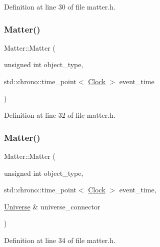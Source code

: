 Definition at line 30 of file matter.\+h.

\mbox{\label{class_matter_ae15b0b8d811fb2ffd01ea039777d1b95}} 
\subsubsection{\texorpdfstring{Matter()}{Matter()}\hspace{0.1cm}{\footnotesize\ttfamily [3/4]}}
{\footnotesize\ttfamily Matter\+::\+Matter (\begin{DoxyParamCaption}\item[{unsigned int}]{object\+\_\+type,  }\item[{std\+::chrono\+::time\+\_\+point$<$ \mbox{\hyperlink{universe_8h_a0ef8d951d1ca5ab3cfaf7ab4c7a6fd80}{Clock}} $>$}]{event\+\_\+time }\end{DoxyParamCaption})\hspace{0.3cm}{\ttfamily [inline]}}



Definition at line 32 of file matter.\+h.

\mbox{\label{class_matter_a724543a0439d3099f5fc0eae68110b75}} 
\subsubsection{\texorpdfstring{Matter()}{Matter()}\hspace{0.1cm}{\footnotesize\ttfamily [4/4]}}
{\footnotesize\ttfamily Matter\+::\+Matter (\begin{DoxyParamCaption}\item[{unsigned int}]{object\+\_\+type,  }\item[{std\+::chrono\+::time\+\_\+point$<$ \mbox{\hyperlink{universe_8h_a0ef8d951d1ca5ab3cfaf7ab4c7a6fd80}{Clock}} $>$}]{event\+\_\+time,  }\item[{\mbox{\hyperlink{class_universe}{Universe}} \&}]{universe\+\_\+connector }\end{DoxyParamCaption})\hspace{0.3cm}{\ttfamily [inline]}}



Definition at line 34 of file matter.\+h.

